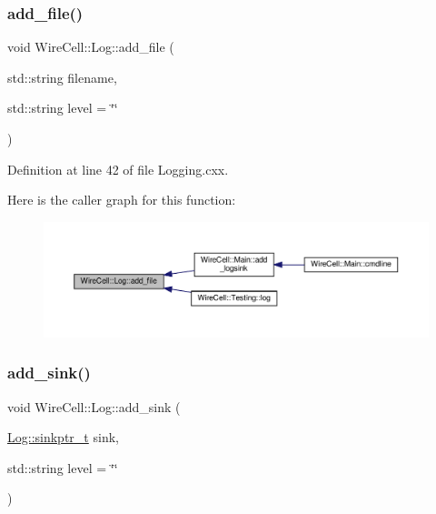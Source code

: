 \subsubsection{\texorpdfstring{add\+\_\+file()}{add\_file()}}
{\footnotesize\ttfamily void Wire\+Cell\+::\+Log\+::add\+\_\+file (\begin{DoxyParamCaption}\item[{std\+::string}]{filename,  }\item[{std\+::string}]{level = {\ttfamily \char`\"{}\char`\"{}} }\end{DoxyParamCaption})}



Definition at line 42 of file Logging.\+cxx.

Here is the caller graph for this function\+:
\nopagebreak
\begin{figure}[H]
\begin{center}
\leavevmode
\includegraphics[width=350pt]{namespace_wire_cell_1_1_log_a2b30e7b1375fa3fdb23be092fe116cfb_icgraph}
\end{center}
\end{figure}
\mbox{\label{namespace_wire_cell_1_1_log_adbf98ba02ee62812b211ede24464c91c}} 
\subsubsection{\texorpdfstring{add\+\_\+sink()}{add\_sink()}}
{\footnotesize\ttfamily void Wire\+Cell\+::\+Log\+::add\+\_\+sink (\begin{DoxyParamCaption}\item[{\hyperlink{namespace_wire_cell_1_1_log_abee3220a6c332928df3d1583550c6e22}{Log\+::sinkptr\+\_\+t}}]{sink,  }\item[{std\+::string}]{level = {\ttfamily \char`\"{}\char`\"{}} }\end{DoxyParamCaption})}



